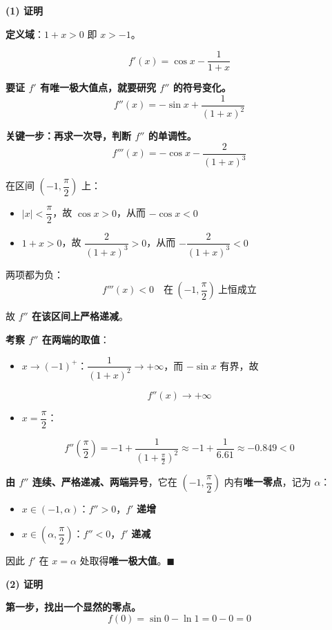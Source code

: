 \par\medskip

\textbf{(1) 证明}

\textbf{定义域}：$1+x>0$ 即 $x>-1$。

\[f'(x)=\cos x-\frac1{1+x}\]

\textbf{要证 $f'$ 有唯一极大值点，就要研究 $f''$ 的符号变化。}
\[f''(x)=-\sin x+\frac1{(1+x)^{2}}\]

\textbf{关键一步：再求一次导，判断 $f''$ 的单调性。}
\[f'''(x)=-\cos x-\frac2{(1+x)^{3}}\]

在区间 $\left(-1,\dfrac\pi2\right)$ 上：
\begin{itemize}
\item $|x|<\dfrac\pi2$，故 $\cos x>0$，从而 $-\cos x<0$
\item $1+x>0$，故 $\dfrac2{(1+x)^{3}}>0$，从而 $-\dfrac2{(1+x)^{3}}<0$
\end{itemize}

两项都为负：
\[f'''(x)<0\quad\text{在}\ \left(-1,\frac\pi2\right)\ \text{上恒成立}\]

故 \textbf{$f''$ 在该区间上严格递减}。

\textbf{考察 $f''$ 在两端的取值}：

\begin{itemize}
\item $x\to(-1)^{+}$：$\dfrac1{(1+x)^{2}}\to+\infty$，而 $-\sin x$ 有界，故
\end{itemize}
\[f''(x)\to+\infty\]

\begin{itemize}
\item $x=\dfrac\pi2$：
\end{itemize}
\[f''\left(\frac\pi2\right)=-1+\frac1{\left(1+\frac\pi2\right)^{2}}\approx-1+\frac1{6.61}\approx-0.849<0\]

\textbf{由 $f''$ 连续、严格递减、两端异号}，它在 $\left(-1,\dfrac\pi2\right)$ 内有\textbf{唯一零点}，记为 $\alpha$：
\begin{itemize}
\item $x\in(-1,\alpha)$：$f''>0$，$f'$ \textbf{递增}
\item $x\in\left(\alpha,\dfrac\pi2\right)$：$f''<0$，$f'$ \textbf{递减}
\end{itemize}

因此 $f'$ 在 $x=\alpha$ 处取得\textbf{唯一极大值}。$\blacksquare$

\par\medskip

\textbf{(2) 证明}

\textbf{第一步，找出一个显然的零点。}
\[f(0)=\sin0-\ln1=0-0=0\]

